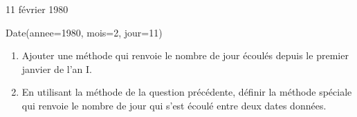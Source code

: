 \documentclass[letterpaper,10pt,english]{sphinxhowto}
\begin{document}
\begin{sphinxVerbatim}[commandchars=\\\{\}]
    

\end{sphinxVerbatim}

\begin{sphinxVerbatim}[commandchars=\\\{\}]
11 février 1980
\end{sphinxVerbatim}

\begin{sphinxVerbatim}[commandchars=\\\{\}]
Date(annee=1980, mois=2, jour=11)
\end{sphinxVerbatim}
\begin{enumerate}
%
\setcounter{enumi}{7}
\item {} 
\sphinxAtStartPar
Ajouter une méthode qui renvoie le nombre de jour écoulés depuis le premier janvier de l’an I.

\item {} 
\sphinxAtStartPar
En utilisant la méthode de la question précédente, définir la méthode spéciale  qui renvoie le nombre de jour qui s’est écoulé entre deux dates données.

\end{enumerate}

\begin{sphinxVerbatim}[commandchars=\\\{\}]
    

    


    
\end{sphinxVerbatim}
\end{document}
